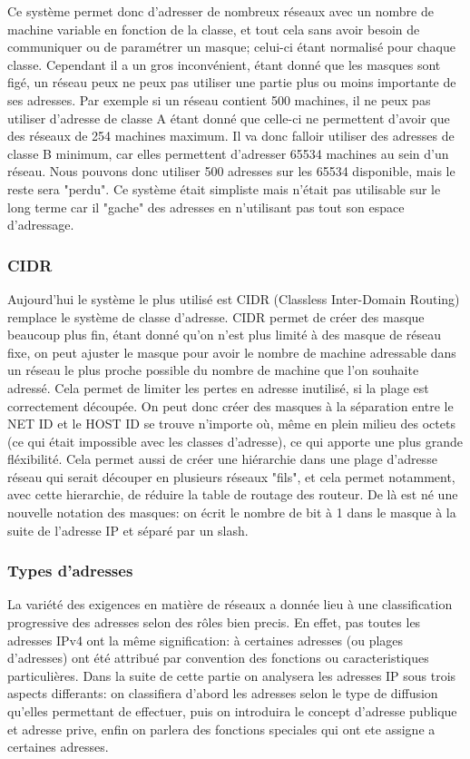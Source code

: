 Ce système permet donc d'adresser de nombreux réseaux avec un nombre de machine
variable en fonction de la classe, et tout cela sans avoir besoin de
communiquer ou de paramétrer un masque; celui-ci étant normalisé pour chaque
classe.  Cependant il a un gros inconvénient, étant donné que les masques sont
figé, un réseau peux ne peux pas utiliser une partie plus ou moins importante
de ses adresses. Par exemple si un réseau contient 500 machines, il ne peux pas
utiliser d'adresse de classe A étant donné que celle-ci ne permettent d'avoir
que des réseaux de 254 machines maximum. Il va donc falloir utiliser des
adresses de classe B minimum, car elles permettent d'adresser 65534 machines au
sein d'un réseau. Nous pouvons donc utiliser 500 adresses sur les 65534
disponible, mais le reste sera "perdu".  Ce système était simpliste mais
n'était pas utilisable sur le long terme car il "gache" des adresses en
n'utilisant pas tout son espace d'adressage.


\subsubsection{CIDR}

Aujourd'hui le système le plus utilisé est CIDR (Classless Inter-Domain
Routing) remplace le système de classe d'adresse. CIDR permet de créer des
masque beaucoup plus fin, étant donné qu'on n'est plus limité à des masque de
réseau fixe, on peut ajuster le masque pour avoir le nombre de machine
adressable dans un réseau le plus proche possible du nombre de machine que l'on
souhaite adressé.  Cela permet de limiter les pertes en adresse inutilisé, si
la plage est correctement découpée.  On peut donc créer des masques à la
séparation entre le NET ID et le HOST ID se trouve n'importe où, même en plein
milieu des octets (ce qui était impossible avec les classes d'adresse), ce qui
apporte une plus grande fléxibilité.  Cela permet aussi de créer une hiérarchie
dans une plage d'adresse réseau qui serait découper en plusieurs réseaux
"fils", et cela permet notamment, avec cette hierarchie, de réduire la table de
routage des routeur.  De là est né une nouvelle notation des masques: on écrit
le nombre de bit à 1 dans le masque à la suite de l'adresse IP et séparé par un
slash.







\subsubsection{Types d'adresses}
La variété des exigences en matière de réseaux a donnée lieu à une
classification progressive des adresses selon des rôles bien precis. En effet,
pas toutes les adresses IPv4 ont la même signification: à certaines adresses
(ou plages d'adresses) ont été attribué par convention des fonctions ou
caracteristiques particulières.  Dans la suite de cette partie on analysera les
adresses IP sous trois aspects differants: on classifiera d'abord les adresses selon
le type de diffusion qu'elles permettant de effectuer, puis on introduira le
concept d'adresse publique et adresse prive, enfin on parlera des fonctions
speciales qui ont ete assigne a certaines adresses.


